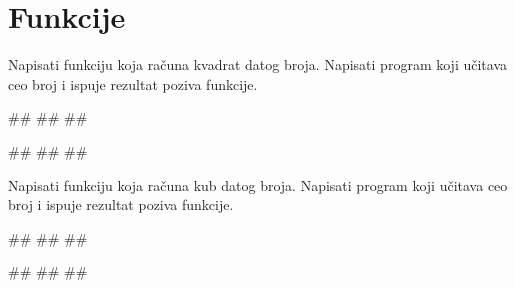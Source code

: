 \section{Funkcije}



\begin{Exercise}[label=v1.4_01] 
Napisati funkciju  koja računa kvadrat datog
broja. Napisati program koji učitava ceo broj i ispuje rezultat poziva
funkcije.

\begin{miditest}
\begin{upotreba}{1}
#\naslovInt#
##
##
\end{upotreba}
\end{miditest}
\begin{miditest}
\begin{upotreba}{2}
#\naslovInt#
##
##
\end{upotreba}
\end{miditest}

\end{Exercise}
\ifresenja 
\begin{Answer}[ref=v1.4_01]
\end{Answer} 
\fi


\begin{Exercise}[label=v1.4_01b] 
Napisati funkciju  koja računa kub datog
broja. Napisati program koji učitava ceo broj i ispuje rezultat poziva
funkcije.

\begin{miditest}
\begin{upotreba}{1}
#\naslovInt#
##
##
\end{upotreba}
\end{miditest}
\begin{miditest}
\begin{upotreba}{2}
#\naslovInt#
##
##
\end{upotreba}
\end{miditest}

\end{Exercise}
\ifresenja 
\begin{Answer}[ref=v1.4_01b]
\end{Answer} 
\fi


